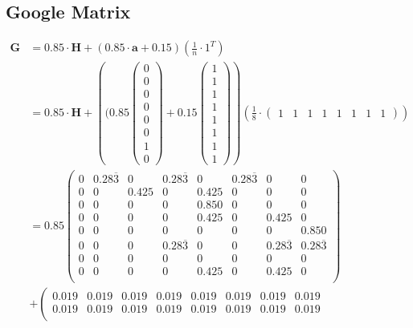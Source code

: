 \documentclass[11pt]{report}
\begin{document}
{\begin{appendices}
\chapter{Google Matrix}
\begin{align*}
\textbf{G} &  = 0.85\cdot\textbf{H} + (0.85\cdot\textbf{a} + 0.15)\left(\frac{1}{n}\cdot 1^T\right)\\
& = 0.85\cdot\textbf{H} + \left((0.85\left(\begin{array}{c}
0\\0\\0\\0\\0\\0\\1\\0\end{array}\right) + 0.15\left(\begin{array}{c}
1\\1\\1\\1\\1\\1\\1\\1\end{array}\right)\right)\left(\frac{1}{8}\cdot\left(\begin{array}{cccccccc}
1&1&1&1&1&1&1&1\end{array}\right)\right)\\
&= 0.85\left(
\begin{array}{cccccccc}
0 & 0.28\overline{3} & 0 & 0.28\overline{3} & 0 & 0.28\overline{3} & 0 & 0  \\
0 & 0 & 0.425 & 0 & 0.425 & 0 & 0 & 0  \\
0 & 0 & 0 & 0 & 0.850 & 0 & 0 & 0  \\
0 & 0 & 0 & 0 & 0.425 & 0 & 0.425 & 0  \\
0 & 0 & 0 & 0 & 0 & 0 & 0 & 0.850  \\
0 & 0 & 0 & 0.28\overline{3} & 0 & 0 & 0.28\overline{3} & 0.28\overline{3}  \\
0 & 0 & 0 & 0 & 0 & 0 & 0 & 0  \\
0 & 0 & 0 & 0 & 0.425 & 0 & 0.425 & 0  \\
\end{array}
\right) \\&+ \left(
\begin{array}{cccccccc}
0.019 & 0.019 & 0.019 & 0.019 & 0.019 & 0.019 & 0.019 & 0.019  \\
0.019 & 0.019 & 0.019 & 0.019 & 0.019 & 0.019 & 0.019 & 0.019  \\

\end{array}
\end{align*}
\end{appendices}}
\end{document}
